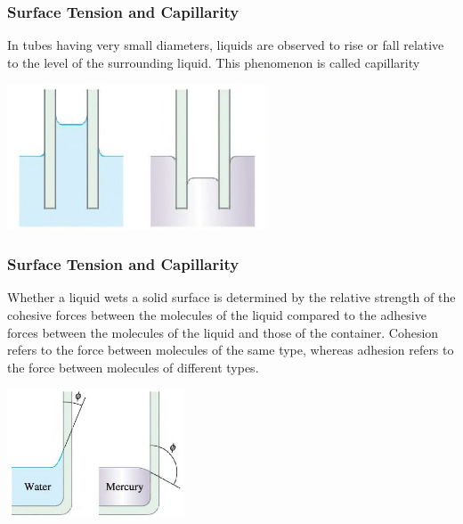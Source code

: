 \documentclass[]{beamer}
\begin{document}
\begin{frame}

\frametitle{Surface Tension and Capillarity}



In tubes having very small diameters, liquids are observed to rise or fall relative
to the level of the surrounding liquid. This phenomenon is called capillarity

\vspace{3mm}



  \begin{center}
  \includegraphics[height=1.7in]{images2/capillarity.jpg}
\end{center}




 \end{frame}



\begin{frame}

\frametitle{Surface Tension and Capillarity}


Whether a liquid wets a solid surface is determined by the relative strength of the
cohesive forces between the molecules of the liquid compared to the adhesive forces
between the molecules of the liquid and those of the container. Cohesion refers to the
force between molecules of the same type, whereas adhesion refers to the force between
molecules of different types.


  \begin{center}
  \includegraphics[height=1.5in]{images2/capillarity2.jpg}
\end{center}

 


 \end{frame}
\end{document}
